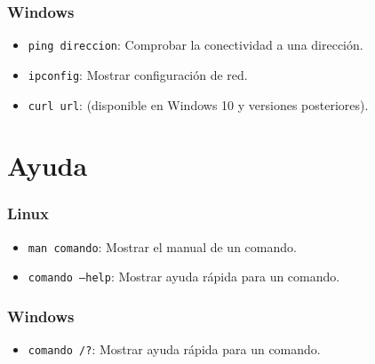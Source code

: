 \subsubsection*{Windows}
\begin{itemize}
    \item \texttt{ping direccion}: Comprobar la conectividad a una dirección.
    \item \texttt{ipconfig}: Mostrar configuración de red.
    \item \texttt{curl url}: (disponible en Windows 10 y versiones posteriores).
\end{itemize}

\section*{Ayuda}

\subsubsection*{Linux}
\begin{itemize}
    \item \texttt{man comando}: Mostrar el manual de un comando.
    \item \texttt{comando --help}: Mostrar ayuda rápida para un comando.
\end{itemize}

\subsubsection*{Windows}
\begin{itemize}
    \item \texttt{comando /?}: Mostrar ayuda rápida para un comando.
\end{itemize}